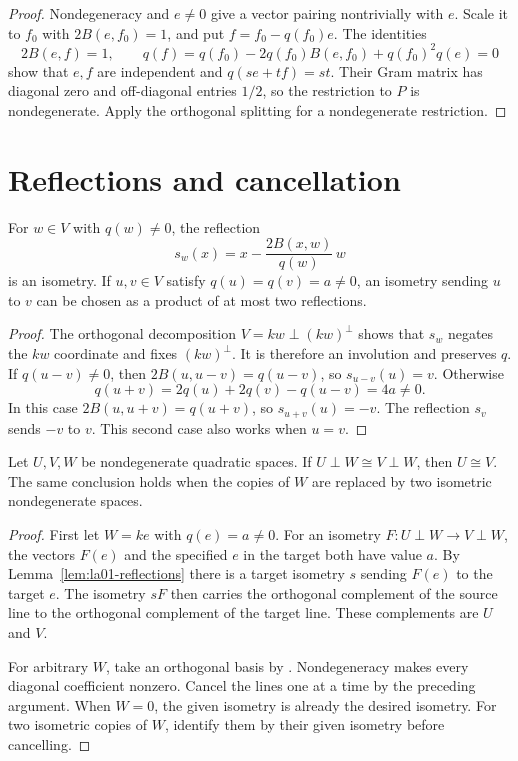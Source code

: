 \begin{proof}
Nondegeneracy and \(e\ne 0\) give a vector pairing nontrivially
with \(e\). Scale it to \(f_0\) with \(2B(e,f_0)=1\), and put
\(f=f_0-q(f_0)e\). The identities
\[
  2B(e,f)=1,\qquad
  q(f)=q(f_0)-2q(f_0)B(e,f_0)+q(f_0)^2q(e)=0
\]
show that \(e,f\) are independent and \(q(se+tf)=st\).
Their Gram matrix has diagonal zero and off-diagonal entries
\(1/2\), so the restriction to \(P\) is nondegenerate. Apply the
orthogonal splitting for a nondegenerate restriction.
\end{proof}

\section{Reflections and cancellation}

\begin{lemma}
\label{lem:la01-reflections}
For \(w\in V\) with \(q(w)\ne 0\), the reflection
\[
  s_w(x)=x-\frac{2B(x,w)}{q(w)}\,w
\]
is an isometry. If \(u,v\in V\) satisfy
\(q(u)=q(v)=a\ne 0\), an isometry sending \(u\) to \(v\)
can be chosen as a product of at most two reflections.
\end{lemma}

\begin{proof}
The orthogonal decomposition \(V=kw\perp(kw)^\perp\) shows
that \(s_w\) negates the \(kw\) coordinate and fixes
\((kw)^\perp\). It is therefore an involution and preserves \(q\).
If \(q(u-v)\ne 0\), then \(2B(u,u-v)=q(u-v)\), so
\(s_{u-v}(u)=v\). Otherwise
\[
  q(u+v)=2q(u)+2q(v)-q(u-v)=4a\ne 0.
\]
In this case \(2B(u,u+v)=q(u+v)\), so \(s_{u+v}(u)=-v\).
The reflection \(s_v\) sends \(-v\) to \(v\). This second case
also works when \(u=v\).
\end{proof}

\begin{theorem}
\label{thm:la01-witt-cancellation}
Let \(U,V,W\) be nondegenerate quadratic spaces. If
\(U\perp W\cong V\perp W\), then \(U\cong V\).
The same conclusion holds when the copies of \(W\) are
replaced by two isometric nondegenerate spaces.
\end{theorem}

\begin{proof}
First let \(W=ke\) with \(q(e)=a\ne 0\). For an isometry
\(F:U\perp W\to V\perp W\), the vectors \(F(e)\) and the
specified \(e\) in the target both have value \(a\).
By Lemma~\ref{lem:la01-reflections} there is a target isometry
\(s\) sending \(F(e)\) to the target \(e\). The isometry \(sF\)
then carries the orthogonal complement of the source line to
the orthogonal complement of the target line. These
complements are \(U\) and \(V\).

For arbitrary \(W\), take an orthogonal basis by
\cite[11.diagonal\_congruence]{d05}. Nondegeneracy makes every
diagonal coefficient nonzero. Cancel the lines one at a time
by the preceding argument. When \(W=0\), the given isometry is
already the desired isometry. For two isometric copies of
\(W\), identify them by their given isometry before cancelling.
\end{proof}


